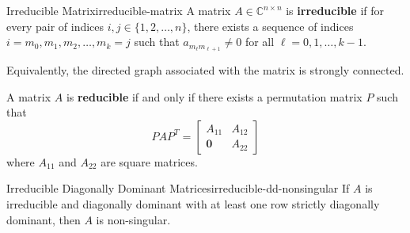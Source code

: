 \begin{definition}{Irreducible Matrix}{irreducible-matrix}
    A matrix $A \in \mathbb{C}^{n \times n}$ is \textbf{irreducible} if for every pair of indices $i, j \in \{1, 2, \ldots, n\}$, there exists a sequence of indices $i = m_0, m_1, m_2, \ldots, m_k = j$ such that $a_{m_\ell m_{\ell+1}} \neq 0$ for all $\ell = 0, 1, \ldots, k-1$.

    Equivalently, the directed graph associated with the matrix is strongly connected.
\end{definition}


    A matrix $A$ is \textbf{reducible} if and only if there exists a permutation matrix $P$ such that
    \begin{equation}
        P A P^T = \begin{bmatrix}
            A_{11} & A_{12} \\
            \mathbf{0} & A_{22}
        \end{bmatrix}
    \end{equation}
    where $A_{11}$ and $A_{22}$ are square matrices.

\begin{theorem}{Irreducible Diagonally Dominant Matrices}{irreducible-dd-nonsingular}
    If $A$ is irreducible and diagonally dominant with at least one row strictly diagonally dominant, then $A$ is non-singular.
\end{theorem}

